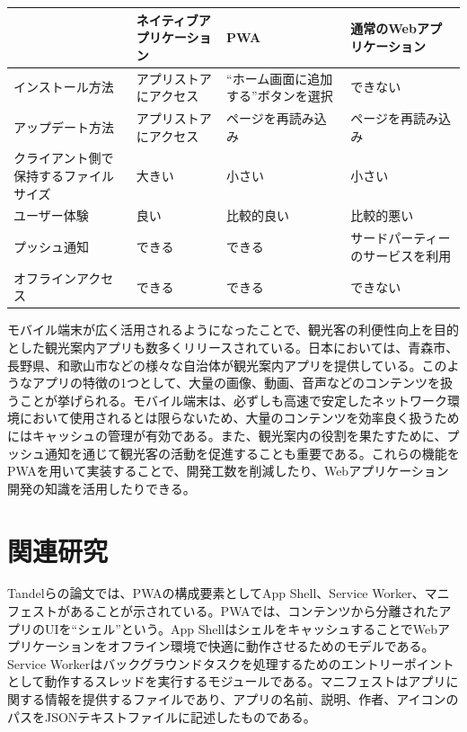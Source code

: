 \begin{multicols*}{2}
\begin{table}
  \centering
  \label{table1}
\begin{tabular}{|p{10em}|p{10em}|p{10em}|p{10em}|}
\hline
          & ネイティブアプリケーション & PWA    & 通常のWebアプリケーション      \\ \hline
インストール方法    & アプリストアにアクセス   & ``ホーム画面に追加する''ボタンを選択 & できない                \\ \hline
アップデート方法    & アプリストアにアクセス  & ページを再読み込み            & ページを再読み込み        \\ \hline
クライアント側で保持するファイルサイズ       & 大きい           & 小さい                     & 小さい                 \\ \hline
ユーザー体験    & 良い & 比較的良い     & 比較的悪い \\ \hline
プッシュ通知    & できる           & できる                     & サードパーティーのサービスを利用 \\ \hline
オフラインアクセス & できる           & できる                     & できない                \\ \hline
\end{tabular}
\end{table}

モバイル端末が広く活用されるようになったことで、観光客の利便性向上を目的とした観光案内アプリも数多くリリースされている。日本においては、青森市\cite{AomoriCityTravelNavi}、 長野県\cite{ShinshuNavi}、和歌山市\cite{WakayamaSightseeing}などの様々な自治体が観光案内アプリを提供している。このようなアプリの特徴の1つとして、大量の画像、動画、音声などのコンテンツを扱うことが挙げられる。モバイル端末は、必ずしも高速で安定したネットワーク環境において使用されるとは限らないため、大量のコンテンツを効率良く扱うためにはキャッシュの管理が有効である。また、観光案内の役割を果たすために、プッシュ通知を通じて観光客の活動を促進することも重要である。これらの機能をPWAを用いて実装することで、開発工数を削減したり、Webアプリケーション開発の知識を活用したりできる。

\section{関連研究}
Tandelらの論文では、PWAの構成要素としてApp Shell、Service Worker、マニフェストがあることが示されている\cite{Tandel2018ProgressiveWebApps}。PWAでは、コンテンツから分離されたアプリのUIを``シェル''という。App ShellはシェルをキャッシュすることでWebアプリケーションをオフライン環境で快適に動作させるためのモデルである。Service Workerはバックグラウンドタスクを処理するためのエントリーポイントとして動作するスレッドを実行するモジュールである。マニフェストはアプリに関する情報を提供するファイルであり、アプリの名前、説明、作者、アイコンのパスをJSONテキストファイルに記述したものである。


\end{multicols*}
